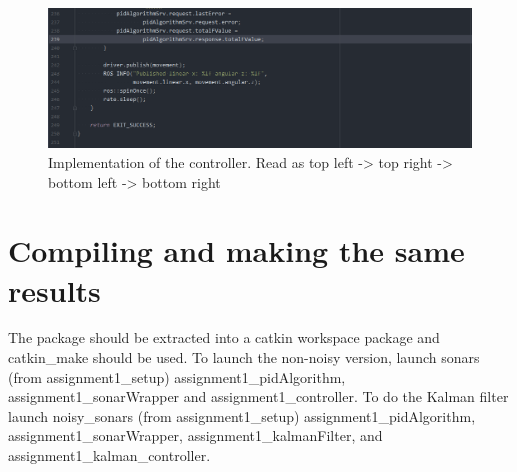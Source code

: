 \documentclass{article}
\begin{document}
\newpage
\begin{figure}[ht]
    \centering
    \includegraphics[scale=0.24]{img/controller5.png}
    \caption{Implementation of the controller. Read as top left -> top right -> 
    bottom left -> bottom right}
    \label{controllerImplement}
\end{figure}
\section{Compiling and making the same results}
The package should be extracted into a catkin workspace package and catkin\_make
should be used. To launch the non-noisy version, launch sonars (from
assignment1\_setup) assignment1\_pidAlgorithm, assignment1\_sonarWrapper and 
assignment1\_controller. To do the Kalman filter launch noisy\_sonars (from
assignment1\_setup) assignment1\_pidAlgorithm, assignment1\_sonarWrapper,
assignment1\_kalmanFilter, and assignment1\_kalman\_controller. 
\newpage


\end{document}
